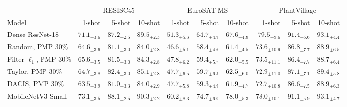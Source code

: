 \begin{tabular}{@{}lrrrrrrrrr@{}}
\toprule
 & \multicolumn{3}{c}{RESISC45} & \multicolumn{3}{c}{EuroSAT-MS} & \multicolumn{3}{c}{PlantVillage} \\
\cmidrule(lr){2-4}\cmidrule(lr){5-7}\cmidrule(lr){8-10}
Model & 1-shot & 5-shot & 10-shot & 1-shot & 5-shot & 10-shot & 1-shot & 5-shot & 10-shot \\
\midrule
Dense ResNet-18 & $71.1_{\pm3.6}$ & $87.2_{\pm2.5}$ & $89.5_{\pm2.3}$ & $51.3_{\pm5.3}$ & $64.7_{\pm4.9}$ & $67.6_{\pm4.8}$ & $79.5_{\pm9.6}$ & $91.4_{\pm5.6}$ & $93.1_{\pm4.4}$ \\
Random, PMP 30\% & $64.6_{\pm3.6}$ & $81.1_{\pm3.0}$ & $84.0_{\pm2.8}$ & $46.6_{\pm5.1}$ & $58.4_{\pm4.6}$ & $61.4_{\pm4.5}$ & $73.6_{\pm10.9}$ & $86.8_{\pm7.7}$ & $88.9_{\pm6.5}$ \\
Filter $\ell_1$, PMP 30\% & $65.6_{\pm3.5}$ & $81.5_{\pm3.0}$ & $84.3_{\pm2.8}$ & $47.8_{\pm6.2}$ & $59.4_{\pm5.7}$ & $62.0_{\pm5.5}$ & $73.5_{\pm11.1}$ & $86.4_{\pm7.7}$ & $88.7_{\pm6.4}$ \\
Taylor, PMP 30\% & $64.7_{\pm3.8}$ & $82.4_{\pm3.0}$ & $85.1_{\pm2.8}$ & $47.7_{\pm6.5}$ & $59.7_{\pm6.3}$ & $62.5_{\pm6.0}$ & $72.9_{\pm11.0}$ & $87.1_{\pm7.1}$ & $89.4_{\pm5.8}$ \\
DACIS, PMP 30\% & $63.5_{\pm3.9}$ & $81.0_{\pm3.3}$ & $84.0_{\pm2.9}$ & $47.7_{\pm5.8}$ & $59.3_{\pm4.9}$ & $61.9_{\pm4.7}$ & $72.7_{\pm10.8}$ & $86.6_{\pm7.5}$ & $88.9_{\pm6.3}$ \\
MobileNetV3-Small & $73.1_{\pm3.5}$ & $88.1_{\pm2.5}$ & $90.3_{\pm2.2}$ & $60.2_{\pm8.3}$ & $74.7_{\pm6.0}$ & $78.0_{\pm5.3}$ & $78.0_{\pm10.1}$ & $91.1_{\pm5.9}$ & $93.1_{\pm4.7}$ \\
\bottomrule
\end{tabular}